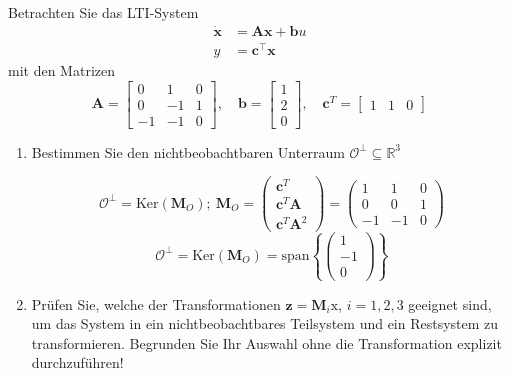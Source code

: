 \documentclass{article}
\begin{document}
\begin{task}
Betrachten Sie das LTI-System
\[ 
\begin{aligned} \dot{\mathbf{x}} &=\mathbf{A} \mathbf{x}+\mathbf{b} u \\ y &=\mathbf{c}^{\top} \mathbf{x} \end{aligned}
 \]
mit den Matrizen
\[ 
\mathbf{A}=\left[\begin{array}{ccc}{0} & {1} & {0} \\ {0} & {-1} & {1} \\ {-1} & {-1} & {0}\end{array}\right], \quad \mathbf{b}=\left[\begin{array}{c}{1} \\ {2} \\ {0}\end{array}\right], \quad \mathbf{c}^{T}=\left[\begin{array}{lll}{1} & {1} & {0}\end{array}\right]
 \]
 \begin{enumerate}[i]
     \item Bestimmen Sie den nichtbeobachtbaren Unterraum $\mathcal{O}^{\perp} \subseteq \mathbb{R}^{3}$
     \begin{solution}
     \[\mathcal{O}^{\perp} =  \text{Ker}\left(\mathbf{M}_O\right); \ \mathbf{M}_O = 
     \begin{pmatrix} \mathbf{c}^T \\ \mathbf{c}^T \mathbf{A} \\ \mathbf{c}^T \mathbf{A}^2 \end{pmatrix} = 
     \begin{pmatrix} 1 & 1 & 0 \\ 0 & 0 & 1 \\ -1 & -1 & 0 \end{pmatrix}\]
     \[ \mathcal{O}^{\perp}=\text{Ker}\left(\mathbf{M}_O\right) = \text{span}\left\{\begin{pmatrix} 1\\-1\\ 0\end{pmatrix}\right\}\]
     \end{solution}
     \item Prüfen Sie, welche der Transformationen $\mathbf{z}=\mathbf{M}_{i}\mathrm{x}$, $i=1,2,3$ geeignet sind, um
das System in ein nichtbeobachtbares Teilsystem und ein Restsystem zu transformieren.
Begrunden Sie Ihr Auswahl ohne die Transformation explizit durchzuführen!
\[ 
\]
\end{enumerate}
\end{task}
\end{document}
